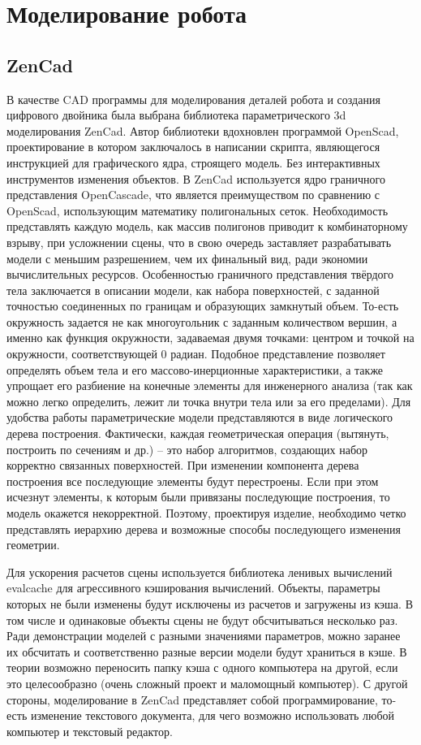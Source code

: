 \section{Моделирование робота}
\subsection{ZenCad}
В качестве CAD программы для моделирования деталей робота и создания цифрового двойника была выбрана библиотека параметрического 3d моделирования ZenCad. Автор библиотеки вдохновлен программой OpenScad, проектирование в котором заключалось в написании скрипта, являющегося инструкцией для графического ядра, строящего модель. Без интерактивных инструментов изменения объектов. В ZenCad используется ядро граничного представления OpenCascade, что является преимуществом по сравнению с OpenScad, использующим математику полигональных сеток. Необходимость представлять каждую модель, как массив полигонов приводит к комбинаторному взрыву, при усложнении сцены, что в свою очередь заставляет разрабатывать модели с меньшим разрешением, чем их финальный вид, ради экономии вычислительных ресурсов. Особенностью граничного представления твёрдого тела заключается в описании модели, как набора поверхностей, с заданной точностью соединенных по границам и образующих замкнутый объем. То-есть окружность задается не как многоугольник с заданным количеством вершин, а именно как функция окружности, задаваемая двумя точками: центром и точкой на окружности, соответствующей 0 радиан. Подобное представление позволяет определять объем тела и его массово-инерционные характеристики, а также упрощает его разбиение на конечные элементы для инженерного анализа (так как можно легко определить, лежит ли точка внутри тела или за его пределами). Для удобства работы параметрические модели представляются в виде логического дерева построения. Фактически, каждая геометрическая операция (вытянуть, построить по сечениям и др.) – это набор алгоритмов, создающих набор корректно связанных поверхностей. При изменении компонента дерева построения все последующие элементы будут перестроены. Если при этом исчезнут элементы, к которым были привязаны последующие построения, то модель окажется некорректной. Поэтому, проектируя изделие, необходимо четко представлять иерархию дерева и возможные способы последующего изменения геометрии.

Для ускорения расчетов сцены используется библиотека ленивых вычислений evalcache для агрессивного кэширования вычислений. Объекты, параметры которых не были изменены будут исключены из расчетов и загружены из кэша. В том числе и одинаковые объекты сцены не будут обсчитываться несколько раз. Ради демонстрации моделей с разными значениями параметров, можно заранее их обсчитать и соответственно разные версии модели будут храниться в кэше. В теории возможно переносить папку кэша с одного компьютера на другой, если это целесообразно (очень сложный проект и маломощный компьютер). С другой стороны, моделирование в ZenCad представляет собой программирование, то-есть изменение текстового документа, для чего возможно использовать любой компьютер и текстовый редактор.


